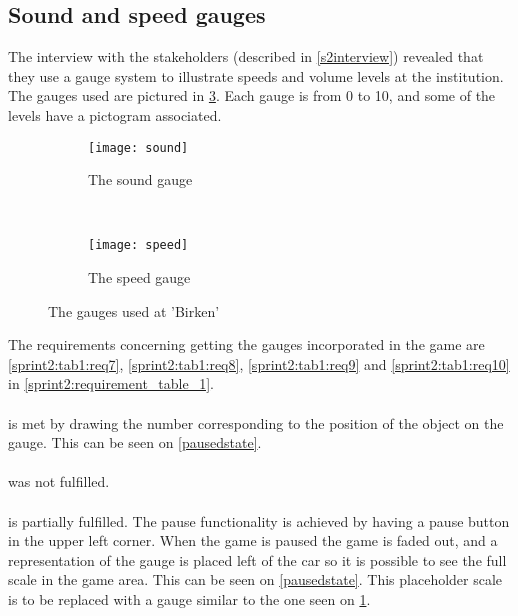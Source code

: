 \subsection{Sound and speed gauges}\label{sprint2:gauges}
The interview with the stakeholders (described in \cref{s2interview}) revealed that they use a gauge system to illustrate speeds and volume levels at the institution. 
The gauges used are pictured in \cref{gauges}.
Each gauge is from 0 to 10, and some of the levels have a pictogram associated.

\begin{figure}[h]
	\centering
        \begin{subfigure}[b]{0.5\textwidth}
                \texttt{[image: sound]}
                \caption{The sound gauge}
                \label{soundgauge}
        \end{subfigure}%
        ~
        \begin{subfigure}[b]{0.5\textwidth}
                \texttt{[image: speed]}
                \caption{The speed gauge}
                \label{speedgauge}
        \end{subfigure}
        \caption{The gauges used at 'Birken'}\label{fig:animals}
        \label{gauges}
\end{figure}

The requirements concerning getting the gauges incorporated in the game are \cref{sprint2:tab1:req7}, \cref{sprint2:tab1:req8}, \cref{sprint2:tab1:req9} and \cref{sprint2:tab1:req10} in \cref{sprint2:requirement_table_1}.

\paragraph{} is met by drawing the number corresponding to the position of the object on the gauge. 
This can be seen on \cref{pausedstate}.

\paragraph{} was not fulfilled.

\paragraph{} is partially fulfilled.
The pause functionality is achieved by having a pause button in the upper left corner. 
When the game is paused the game is faded out, and a representation of the gauge is placed left of the car so it is possible to see the full scale in the game area.
This can be seen on \cref{pausedstate}.
This placeholder scale is to be replaced with a gauge similar to the one seen on \cref{soundgauge}.

